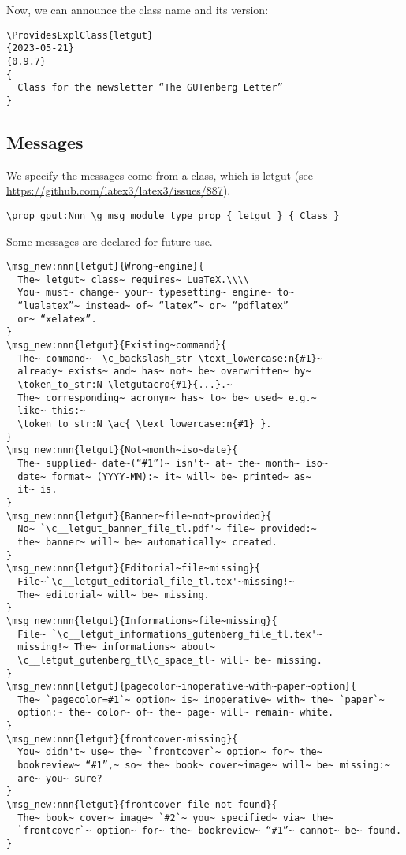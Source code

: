 \documentclass{letgut}
\begin{document}
Now, we can announce the class name and its version:

\begin{lstlisting}
\ProvidesExplClass{letgut}
{2023-05-21}
{0.9.7}
{
  Class for the newsletter “The GUTenberg Letter”
}
\end{lstlisting}

\subsection{Messages}
\label{ImplementationMessages-xg7g55h0jlj0}
We specify the messages come from a class, which is letgut (see
\url{https://github.com/latex3/latex3/issues/887}).

\begin{lstlisting}
\prop_gput:Nnn \g_msg_module_type_prop { letgut } { Class }
\end{lstlisting}

Some messages are declared for future use.

\begin{lstlisting}
\msg_new:nnn{letgut}{Wrong~engine}{
  The~ letgut~ class~ requires~ LuaTeX.\\\\
  You~ must~ change~ your~ typesetting~ engine~ to~
  “lualatex”~ instead~ of~ “latex”~ or~ “pdflatex”
  or~ “xelatex”.
}
\msg_new:nnn{letgut}{Existing~command}{
  The~ command~  \c_backslash_str \text_lowercase:n{#1}~
  already~ exists~ and~ has~ not~ be~ overwritten~ by~
  \token_to_str:N \letgutacro{#1}{...}.~
  The~ corresponding~ acronym~ has~ to~ be~ used~ e.g.~
  like~ this:~
  \token_to_str:N \ac{ \text_lowercase:n{#1} }.
}
\msg_new:nnn{letgut}{Not~month~iso~date}{
  The~ supplied~ date~(“#1”)~ isn't~ at~ the~ month~ iso~
  date~ format~ (YYYY-MM):~ it~ will~ be~ printed~ as~
  it~ is.
}
\msg_new:nnn{letgut}{Banner~file~not~provided}{
  No~ `\c__letgut_banner_file_tl.pdf'~ file~ provided:~
  the~ banner~ will~ be~ automatically~ created.
}
\msg_new:nnn{letgut}{Editorial~file~missing}{
  File~`\c__letgut_editorial_file_tl.tex'~missing!~
  The~ editorial~ will~ be~ missing.
}
\msg_new:nnn{letgut}{Informations~file~missing}{
  File~ `\c__letgut_informations_gutenberg_file_tl.tex'~
  missing!~ The~ informations~ about~
  \c__letgut_gutenberg_tl\c_space_tl~ will~ be~ missing.
}
\msg_new:nnn{letgut}{pagecolor~inoperative~with~paper~option}{
  The~ `pagecolor=#1`~ option~ is~ inoperative~ with~ the~ `paper`~
  option:~ the~ color~ of~ the~ page~ will~ remain~ white.
}
\msg_new:nnn{letgut}{frontcover-missing}{
  You~ didn't~ use~ the~ `frontcover`~ option~ for~ the~
  bookreview~ “#1”,~ so~ the~ book~ cover~image~ will~ be~ missing:~
  are~ you~ sure?
}
\msg_new:nnn{letgut}{frontcover-file-not-found}{
  The~ book~ cover~ image~ `#2`~ you~ specified~ via~ the~
  `frontcover`~ option~ for~ the~ bookreview~ “#1”~ cannot~ be~ found.
}
\end{lstlisting}
\end{document}
